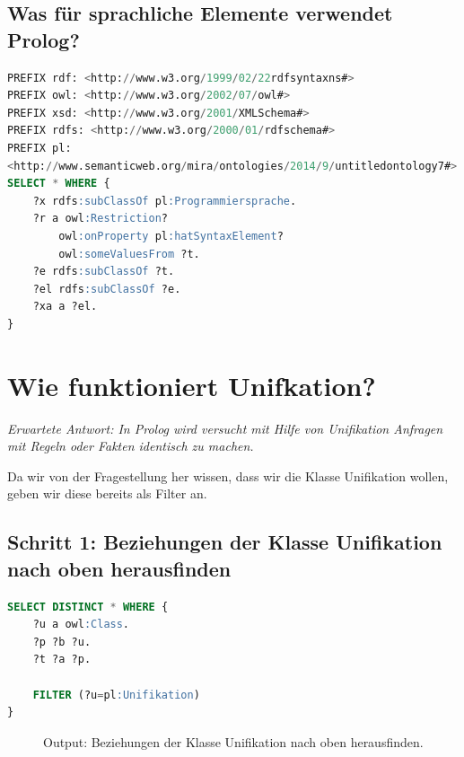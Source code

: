 \subsection{Was für sprachliche Elemente verwendet Prolog?}
\label{ssec:anh_beispiel_b_3}
\begin{lstlisting}[caption={Was für sprachliche Elemente verwendet Prolog?},captionpos=b,language=SQL]
PREFIX rdf: <http://www.w3.org/1999/02/22rdfsyntaxns#>
PREFIX owl: <http://www.w3.org/2002/07/owl#>
PREFIX xsd: <http://www.w3.org/2001/XMLSchema#>
PREFIX rdfs: <http://www.w3.org/2000/01/rdfschema#>
PREFIX pl: 
<http://www.semanticweb.org/mira/ontologies/2014/9/untitledontology7#>
SELECT * WHERE {
	?x rdfs:subClassOf pl:Programmiersprache.
	?r a owl:Restriction?
		owl:onProperty pl:hatSyntaxElement?
		owl:someValuesFrom ?t.
	?e rdfs:subClassOf ?t.
	?el rdfs:subClassOf ?e.
	?xa a ?el.
}
\end{lstlisting}


\section{Wie funktioniert Unifkation?}
\label{sec:anh_beispiel_c}

\textit{Erwartete Antwort: In Prolog wird versucht mit Hilfe von Unifikation Anfragen mit Regeln oder Fakten identisch zu machen.}

Da wir von der Fragestellung her wissen, dass wir die Klasse Unifikation wollen, geben wir diese bereits als Filter an.

\subsection{Schritt 1: Beziehungen der Klasse Unifikation nach oben herausfinden}
\label{ssec:anh_beispiel_c_1}

\begin{lstlisting}[caption={Beziehungen der Klasse Unifikation nach oben herausfinden},captionpos=b,language=SQL]
SELECT DISTINCT * WHERE {
	?u a owl:Class.
	?p ?b ?u.
	?t ?a ?p.
	
	FILTER (?u=pl:Unifikation)
}
\end{lstlisting}

\begin{figure}[H]
\centering {}
\caption{Output: Beziehungen der Klasse Unifikation nach oben herausfinden.\label{fig:prolog_1}\protect\footnotemark}
\end{figure}


